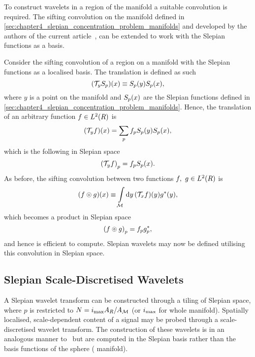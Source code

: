 To construct wavelets in a region of the manifold a suitable convolution is required.
The sifting convolution on the manifold defined in \cref{sec:chapter4_slepian_concentration_problem_manifolds} and developed by the authors of the current article~\cite{Roddy2021}, can be extended to work with the Slepian functions as a basis.

Consider the sifting convolution of a region on a manifold with the Slepian functions as a localised basis.
The translation is defined as such
%
\begin{equation}
	(\mathcal{T}_{y}{S}_{p})(x)
	\equiv {S}_{p}(y) {S}_{p}(x),
\end{equation}
%
where \(y\) is a point on the manifold and \({S}_{p}(x)\) are the Slepian functions defined in \cref{sec:chapter4_slepian_concentration_problem_manifolds}.
Hence, the translation of an arbitrary function \(f \in L^{2}(R)\) is
%
\begin{equation}
	(\mathcal{T}_{y}f)(x)
	= \sum\limits_{p} {f}_{p} {S}_{p}(y) {S}_{p}(x),
\end{equation}
%
which is the following in Slepian space
%
\begin{equation}
	{(\mathcal{T}_{y}f)}_{p}
	= {f}_{p} {S}_{p}(x).
\end{equation}
%
As before, the sifting convolution between two functions \(f,\ g \in L^{2}(R)\) is
%
\begin{equation}
	(f \circledcirc{} g)(x)
	\equiv \int\limits_{\mathcal{M}} \dd{y} (\mathcal{T}_{x}f)(y) g^{\ast}(y),
\end{equation}
%
which becomes a product in Slepian space
%
\begin{equation}
	{(f \circledcirc{} g)}_{p}
	= {f}_{p} {g}_{p}^{\ast},
\end{equation}
%
and hence is efficient to compute.
Slepian wavelets may now be defined utilising this convolution in Slepian space.

\subsection{Slepian Scale-Discretised Wavelets}\label{sec:chapter4_slepian_scale_discretised_wavelets}

A Slepian wavelet transform can be constructed through a tiling of Slepian space, where \(p\) is restricted to \(N=i_{\text{max}} A_{R}/A_{\mathcal{M}}\) (or \(i_{\text{max}}{}\) for whole manifold).
Spatially localised, scale-dependent content of a signal may be probed through a scale-discretised wavelet transform.
The construction of these wavelets is in an analogous manner to~\cite{Wiaux2008,McEwen2018} but are computed in the Slepian basis rather than the basis functions of the sphere (\cf{} manifold).

